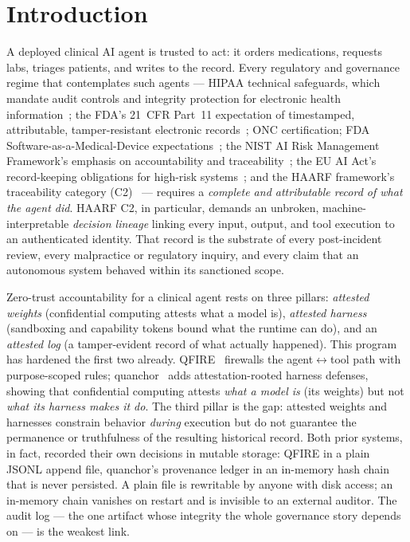 \documentclass[11pt]{article}
\begin{document}
\vspace{0.3em}

\section{Introduction}
A deployed clinical AI agent is trusted to act: it orders medications, requests
labs, triages patients, and writes to the record. Every regulatory and governance
regime that contemplates such agents --- HIPAA technical safeguards, which mandate
audit controls and integrity protection for electronic health
information~\cite{hipaa164312}; the FDA's 21~CFR Part~11 expectation of timestamped,
attributable, tamper-resistant electronic records~\cite{cfr11}; ONC certification;
FDA Software-as-a-Medical-Device expectations~\cite{fdapccp}; the NIST AI Risk
Management Framework's emphasis on accountability and
traceability~\cite{nistairmf}; the EU AI Act's record-keeping obligations for
high-risk systems~\cite{euaiact}; and the HAARF framework's traceability category
(C2)~\cite{schwoebel2026haarf} --- requires a \emph{complete and attributable record of what
the agent did}. HAARF C2, in particular, demands an unbroken, machine-interpretable
\emph{decision lineage} linking every input, output, and tool execution to an
authenticated identity. That record is the substrate of every post-incident review,
every malpractice or regulatory inquiry, and every claim that an autonomous system
behaved within its sanctioned scope.

Zero-trust accountability for a clinical agent rests on three pillars:
\emph{attested weights} (confidential computing attests what a model is),
\emph{attested harness} (sandboxing and capability tokens bound what the runtime
can do), and an \emph{attested log} (a tamper-evident record of what actually
happened). This program has hardened the first two already. QFIRE~\cite{schwoebel2026qfire}
firewalls the agent$\leftrightarrow$tool path with purpose-scoped rules;
quanchor~\cite{pristineweights2026} adds attestation-rooted harness defenses,
showing that confidential computing attests \emph{what a model is} (its weights)
but not \emph{what its harness makes it do}. The third pillar is the gap: attested
weights and harnesses constrain behavior \emph{during} execution but do not
guarantee the permanence or truthfulness of the resulting historical record. Both
prior systems, in fact, recorded their own decisions in mutable storage: QFIRE in a
plain JSONL append file, quanchor's provenance ledger in an in-memory hash chain
that is never persisted. A plain file is rewritable by anyone with disk access; an
in-memory chain vanishes on restart and is invisible to an external auditor. The
audit log --- the one artifact whose integrity the whole governance story depends
on --- is the weakest link.
\end{document}
